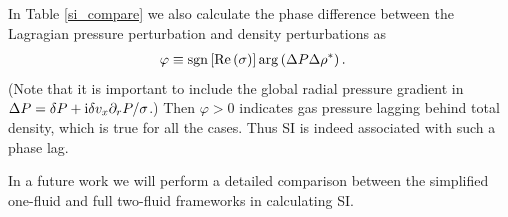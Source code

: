 In Table \ref{si_compare} we also calculate the phase difference
between the Lagragian pressure perturbation and density perturbations
as    
\begin{align*} 
\varphi&\equiv \operatorname{sgn}{\left[\operatorname{Re}{(\sigma)}\right]}\arg\left(\Delta
  P\Delta\rho^*\right).\notag 
\end{align*}
(Note that it is important to include 
the global radial pressure gradient in $\Delta P = \delta P + \mathrm{i} \delta v_x \partial_rP/\sigma$.) Then 
$\varphi > 0 $ indicates gas pressure lagging behind total density, 
which is true for all the cases. Thus SI is indeed associated with
such a phase lag.




In a future work we will perform a detailed comparison between the
simplified one-fluid and full two-fluid frameworks in calculating SI. 










